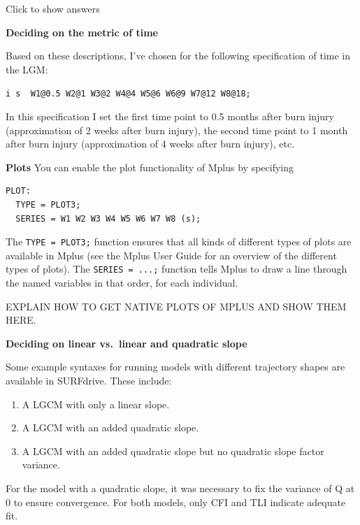 \documentclass[
]{book}
\providecommand{\tightlist}{%
  \setlength{\itemsep}{0pt}\setlength{\parskip}{0pt}}
\begin{document}
Click to show answers

\textbf{Deciding on the metric of time}

Based on these descriptions, I've chosen for the following specification of time in the LGM:

\texttt{i\ s\ \textbar{}\ W1@0.5\ W2@1\ W3@2\ W4@4\ W5@6\ W6@9\ W7@12\ W8@18;}

In this specification I set the first time point to 0.5 months after burn injury (approximation of 2 weeks after burn injury), the second time point to 1 month after burn injury (approximation of 4 weeks after burn injury), etc.

\textbf{Plots}
You can enable the plot functionality of Mplus by specifying

\begin{verbatim}
PLOT:
  TYPE = PLOT3;
  SERIES = W1 W2 W3 W4 W5 W6 W7 W8 (s);
\end{verbatim}

The \texttt{TYPE\ =\ PLOT3;} function ensures that all kinds of different types of plots are available in Mplus (see the Mplus User Guide for an overview of the different types of plots). The \texttt{SERIES\ =\ ...;} function tells Mplus to draw a line through the named variables in that order, for each individual.

EXPLAIN HOW TO GET NATIVE PLOTS OF MPLUS AND SHOW THEM HERE.

\textbf{Deciding on linear vs.~linear and quadratic slope}

Some example syntaxes for running models with different trajectory shapes are available in SURFdrive. These include:

\begin{enumerate}
\def\labelenumi{\arabic{enumi}.}
\tightlist
\item
  A LGCM with only a linear slope.
\item
  A LGCM with an added quadratic slope.
\item
  A LGCM with an added quadratic slope but no quadratic slope factor variance.
\end{enumerate}

For the model with a quadratic slope, it was necessary to fix the variance of Q at 0 to ensure convergence. For both models, only CFI and TLI indicate adequate fit.
\end{document}
